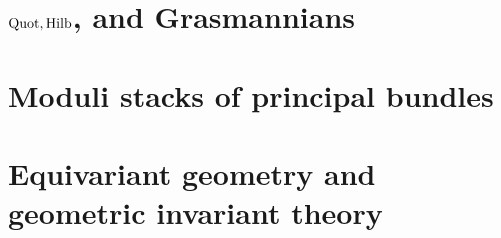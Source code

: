         \chapter{\texorpdfstring{$\mathrm{Quot}, \mathrm{Hilb}$, and Grasmannians}{}}
            \begin{abstract}
                
            \end{abstract}
            
            \minitoc

            

            

            
    
        \chapter{Moduli stacks of principal bundles}
            \begin{abstract}
                
            \end{abstract}
            
            \minitoc

            

            

        \chapter{Equivariant geometry and geometric invariant theory}
            \begin{abstract}
                
            \end{abstract}

            

            

            
	
    \printbibliography

